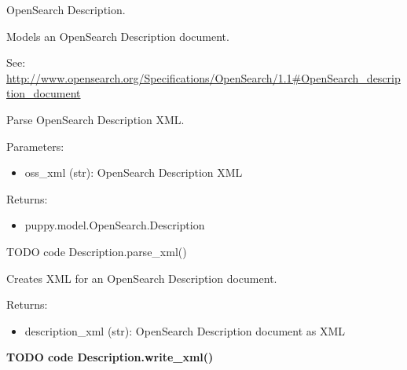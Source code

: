 \documentclass[letterpaper,10pt,english]{sphinxmanual}
\begin{document}
\begin{fulllineitems}
\label{api3.0:puppy.model.Description}
OpenSearch Description.

Models an OpenSearch Description document.

See: \href{http://www.opensearch.org/Specifications/OpenSearch/1.1\#OpenSearch\_description\_document}{http://www.opensearch.org/Specifications/OpenSearch/1.1\#OpenSearch\_description\_document}

\begin{fulllineitems}
\label{api3.0:puppy.model.Description.parse_xml}
Parse OpenSearch Description XML.

Parameters:
\begin{itemize}
\item {} 
oss\_xml (str): OpenSearch Description XML

\end{itemize}

Returns:
\begin{itemize}
\item {} 
puppy.model.OpenSearch.Description

\end{itemize}

TODO code Description.parse\_xml()

\end{fulllineitems}


\begin{fulllineitems}
\label{api3.0:puppy.model.Description.write_xml}
Creates XML for an OpenSearch Description document.

Returns:
\begin{itemize}
\item {} 
description\_xml (str): OpenSearch Description document as XML

\end{itemize}

\textbf{TODO code Description.write\_xml()}

\end{fulllineitems}


\end{fulllineitems}
\end{document}
